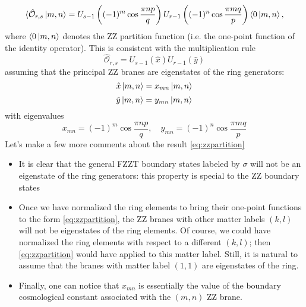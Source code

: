 \begin{equation}
\langle\hat{\mathcal{O}}_{r,s}\ket{m,n} = U_{s-1}\left((-1)^m\cos\frac{\pi n p}{q}\right)U_{r-1}\left((-1)^n \cos\frac{\pi m q}{p}\right)\langle 0\ket{m,n},
\label{eq:zzpartition}
\end{equation}
where $\langle 0\ket{m,n}$ denotes the ZZ partition function (i.e. the one-point function of the identity operator). This is consistent with the multiplication rule 
\begin{equation}
\hat{\mathcal{O}}_{r,s} = U_{s-1}(\hat{x})U_{r-1}(\hat{y})
\end{equation}
assuming that the principal ZZ branes are eigenstates of the ring generators:
\begin{equation}
\hat{x}\ket{m,n} = x_{mn}\ket{m,n}
\end{equation}
\begin{equation}
\hat{y}\ket{m,n} = y_{mn}\ket{m,n}
\end{equation}
with eigenvalues
\begin{equation}
x_{mn} = (-1)^m\cos\frac{\pi n p}{q}, \quad y_{mn} = (-1)^n\cos\frac{\pi m q}{p}
\end{equation}
Let's make a few more comments about the result \eqref{eq:zzpartition}
\begin{itemize}
\item It is clear that the general FZZT boundary states labeled by $\sigma$ will not be an eigenstate of the ring generators: this property is special to the ZZ boundary states
\item Once we have normalized the ring elements to bring their one-point functions to the form \eqref{eq:zzpartition}, the ZZ branes with other matter labels $(k,l)$ will not be eigenstates of the ring elements. Of course, we could have normalized the ring elements with respect to a different $(k,l)$; then \eqref{eq:zzpartition} would have applied to this matter label. Still, it is natural to assume that the branes with matter label $(1,1)$ are eigenstates of the ring.
\item Finally, one can notice that $x_{mn}$ is essentially the value of the boundary cosmological constant associated with the $(m,n)$ ZZ brane. 
\end{itemize}






